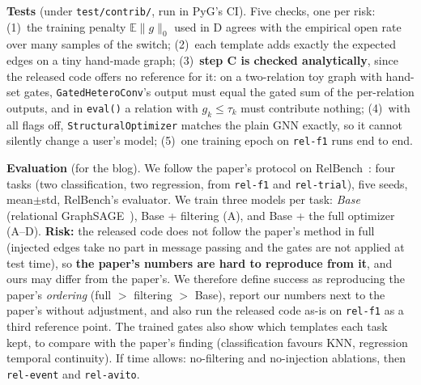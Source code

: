 \documentclass{article}
\newcommand{\code}[1]{\texttt{#1}}
\newcommand{\E}{\mathbb{E}}
\begin{document}
\textbf{Tests} (under \code{test/contrib/}, run in PyG's CI). Five checks, one per risk: (1)~the training penalty $\E\|g\|_0$ used in D agrees with the empirical open rate over many samples of the switch; (2)~each template adds exactly the expected edges on a tiny hand-made graph; (3)~\textbf{step C is checked analytically}, since the released code offers no reference for it: on a two-relation toy graph with hand-set gates, \code{GatedHeteroConv}'s output must equal the gated sum of the per-relation outputs, and in \code{eval()} a relation with $g_k\le\tau_k$ must contribute nothing; (4)~with all flags off, \code{StructuralOptimizer} matches the plain GNN exactly, so it cannot silently change a user's model; (5)~one training epoch on \code{rel-f1} runs end to end.

\textbf{Evaluation} (for the blog). We follow the paper's protocol on RelBench~\cite{robinson2024relbench}: four tasks (two classification, two regression, from \code{rel-f1} and \code{rel-trial}), five seeds, mean$\pm$std, RelBench's evaluator. We train three models per task: \emph{Base} (relational GraphSAGE~\cite{hamilton2017sage}), Base + filtering (A), and Base + the full optimizer (A--D). \textbf{Risk:} the released code does not follow the paper's method in full (injected edges take no part in message passing and the gates are not applied at test time), so \textbf{the paper's numbers are hard to reproduce from it}, and ours may differ from the paper's. We therefore define success as reproducing the paper's \emph{ordering} (full $>$ filtering $>$ Base), report our numbers next to the paper's without adjustment, and also run the released code as-is on \code{rel-f1} as a third reference point. The trained gates also show which templates each task kept, to compare with the paper's finding (classification favours KNN, regression temporal continuity). If time allows: no-filtering and no-injection ablations, then \code{rel-event} and \code{rel-avito}.

\vspace{-1.1em}
\end{document}
